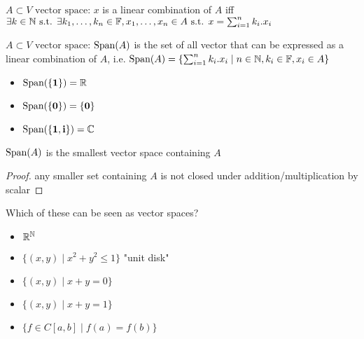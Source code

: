 \begin{definition}
	$A \subset V \text{ vector space}$: $x$ is a linear combination of $A$ iff $\exists k \in \mathbb{N} \text{ s.t. } \exists k_1,\dots,k_n \in \mathbb{F}, x_1,\dots,x_n \in A \text{ s.t. } x=\sum_{i=1}^{n}k_i.x_i$
\end{definition}
\begin{definition}[Span]
	$A \subset V \text{ vector space}$: $\text{Span}(A)$ is the set of all vector that can be expressed as a linear combination of $A$, i.e. $\text{Span}(A)=\{ \sum_{i=1}^{n}k_i.x_i \mid n\in \mathbb{N}, k_i \in \mathbb{F}, x_i\in A \}$
\end{definition}
\begin{example}
	\begin{itemize}
		\item $\text{Span}(\{\textbf{1}\})=\mathbb{R}$
		\item $\text{Span}(\{\textbf{0}\})=\{\textbf{0}\}$
		\item $\text{Span}(\{\textbf{1},\textbf{i}\})=\mathbb{C}$
	\end{itemize}
\end{example}
\begin{property}
	$\text{Span}(A)$ is the smallest vector space containing $A$
\end{property}
\begin{proof}
	any smaller set containing $A$ is not closed under addition/multiplication by scalar
\end{proof}
\begin{exercise}
	Which of these can be seen as vector spaces?
	\begin{itemize}
		\item $\mathbb{R}^{\mathbb{N}}$
		\item $\{ (x,y) \mid x^2+y^2 \leq 1 \}$ "unit disk"
		\item $\{ (x,y) \mid x+y=0 \}$
		\item $\{ (x,y) \mid x+y=1 \}$
		\item $\{ f \in C\left[ a,b \right] \mid f(a)=f(b) \}$
	\end{itemize}
\end{exercise}



